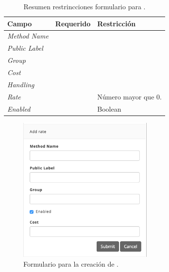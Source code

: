 \begin{table}[H]
    \centering
	\begin{tabular}{ |l|c||l| }
		\hline Campo & Requerido & Restricción \\ \hline
		\multirow{1}{*}{\textit{Method Name}} 	&  \checkmark 	& \\ \hline
		\multirow{1}{*}{\textit{Public Label}} 	&  \checkmark	& \\ \hline
		\multirow{1}{*}{\textit{Group}} 		&  \checkmark	& \\ \hline
		\multirow{1}{*}{\textit{Cost}} 			&  				& \\ \hline
		\multirow{1}{*}{\textit{Handling}} 		&  				& \\ \hline
		\multirow{1}{*}{\textit{Rate}} 			&  \checkmark	& Número mayor que 0. \\ \hline
		\multirow{1}{*}{\textit{Enabled}} 		&  \checkmark	& Boolean \\ \hline
		\hline
	\end{tabular}
 	\caption{Resumen restrincciones formulario para \shippingEF.}
    \label{tab:dashboard:shipping:form:restrictions:shipping}
\end{table}

\begin{figure}[H]
	\centering
	\includegraphics[width=0.6\textwidth]{figuras/dashboard/shipping/form_shipping_add.png}
	\caption{Formulario para la creación de \shippingEF.}
	\label{figure:dashboard:shipping:form_shipping_add}
\end{figure}



